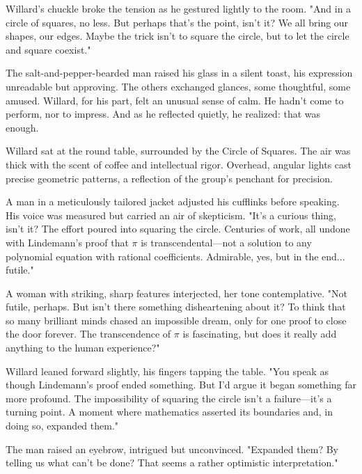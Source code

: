 \smallskip

Willard’s chuckle broke the tension as he gestured lightly to the room.  
"And in a circle of squares, no less. But perhaps that’s the point, isn’t it? We all bring our shapes, our edges. Maybe the trick isn’t to square the circle, but to let the circle and square coexist."

\smallskip

The salt-and-pepper-bearded man raised his glass in a silent toast, his expression unreadable but approving. The others exchanged glances, some thoughtful, some amused. Willard, for his part, felt an unusual sense of calm. He hadn’t come to perform, nor to impress. And as he reflected quietly, he realized: that was enough.

\smallskip

Willard sat at the round table, surrounded by the Circle of Squares. The air was thick with the scent of coffee and intellectual rigor. Overhead, angular lights cast precise geometric patterns, a reflection of the group’s penchant for precision.

\smallskip

A man in a meticulously tailored jacket adjusted his cufflinks before speaking. His voice was measured but carried an air of skepticism.  
"It’s a curious thing, isn’t it? The effort poured into squaring the circle. Centuries of work, all undone with Lindemann’s proof that \(\pi\) is transcendental—not a solution to any polynomial equation with rational coefficients. Admirable, yes, but in the end... futile."

\smallskip

A woman with striking, sharp features interjected, her tone contemplative.  
"Not futile, perhaps. But isn’t there something disheartening about it? To think that so many brilliant minds chased an impossible dream, only for one proof to close the door forever. The transcendence of \(\pi\) is fascinating, but does it really add anything to the human experience?"

\smallskip

Willard leaned forward slightly, his fingers tapping the table.  
"You speak as though Lindemann’s proof ended something. But I’d argue it began something far more profound. The impossibility of squaring the circle isn’t a failure—it’s a turning point. A moment where mathematics asserted its boundaries and, in doing so, expanded them."

\smallskip

The man raised an eyebrow, intrigued but unconvinced.  
"Expanded them? By telling us what can’t be done? That seems a rather optimistic interpretation."


